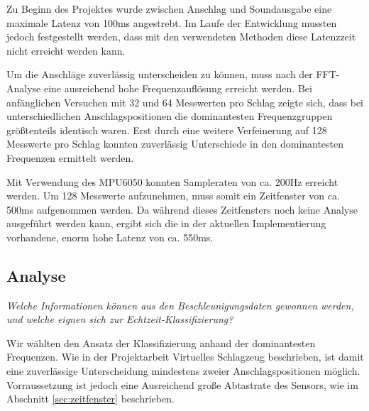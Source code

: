 Zu Beginn des Projektes wurde zwischen Anschlag und Soundausgabe eine maximale Latenz von 100ms angestrebt. Im Laufe der Entwicklung mussten jedoch festgestellt werden, dass mit den verwendeten Methoden diese Latenzzeit nicht erreicht werden kann.

Um die Anschläge zuverlässig unterscheiden zu können, muss nach der FFT-Analyse eine ausreichend hohe Frequenzauflösung erreicht werden. Bei anfänglichen Versuchen mit 32 und 64 Messwerten pro Schlag zeigte sich, dass bei unterschiedlichen Anschlagspositionen die dominantesten Frequenzgruppen größtenteils identisch waren. Erst durch eine weitere Verfeinerung auf 128 Messwerte pro Schlag konnten zuverlässig Unterschiede in den dominantesten Frequenzen ermittelt werden.

Mit Verwendung des MPU6050 konnten Sampleraten von ca. 200Hz erreicht werden. Um 128 Messwerte aufzunehmen, muss somit ein Zeitfenster von ca. 500ms aufgenommen werden. Da während dieses Zeitfensters noch keine Analyse ausgeführt werden kann, ergibt sich die in der aktuellen Implementierung vorhandene, enorm hohe Latenz von ca. 550ms.



\subsection{Analyse}
\textit{Welche Informationen können aus den Beschleunigungsdaten gewonnen werden, und welche eignen sich zur Echtzeit-Klassifizierung?}

Wir wählten den Ansatz der Klassifizierung anhand der dominantesten Frequenzen. Wie in der Projektarbeit \glqq Virtuelles Schlagzeug\grqq \cite{virtSchlagzeug} beschrieben, ist damit eine zuverlässige Unterscheidung mindestens zweier Anschlagspositionen möglich. Vorraussetzung ist jedoch eine Ausreichend große Abtastrate des Sensors, wie im Abschnitt \ref{sec:zeitfenster} beschrieben.